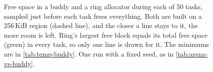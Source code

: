 \begin{figure}[htb]
\caption{Free space in a buddy and a ring allocator during each of 50
tasks, sampled just before each task frees everything. Both are built on a
256\,KiB region (dashed line), and the closer a line stays to it, the more room is
left. Ring's largest free block equals its total
free space (green) in every task, so only one line is drawn for it. The
minimums are in \cref{tab:temp-buddy}. One run with a fixed seed, as in
\cref{tab:arena-vs-buddy}.}
\label{fig:temp-buddy-series}
\end{figure}
